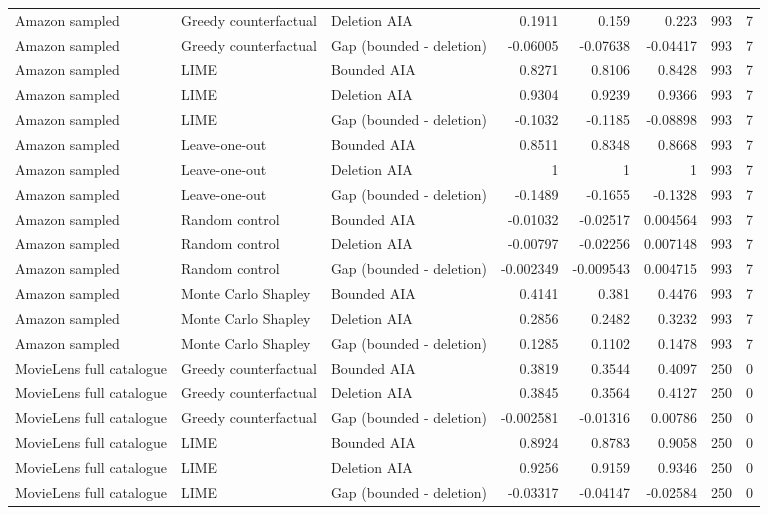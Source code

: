 \begin{table}[t]
{\begin{tabular}{lllrrrrr}
Amazon sampled & Greedy counterfactual & Deletion AIA & 0.1911 & 0.159 & 0.223 & 993 & 7 \\
Amazon sampled & Greedy counterfactual & Gap (bounded - deletion) & -0.06005 & -0.07638 & -0.04417 & 993 & 7 \\
Amazon sampled & LIME & Bounded AIA & 0.8271 & 0.8106 & 0.8428 & 993 & 7 \\
Amazon sampled & LIME & Deletion AIA & 0.9304 & 0.9239 & 0.9366 & 993 & 7 \\
Amazon sampled & LIME & Gap (bounded - deletion) & -0.1032 & -0.1185 & -0.08898 & 993 & 7 \\
Amazon sampled & Leave-one-out & Bounded AIA & 0.8511 & 0.8348 & 0.8668 & 993 & 7 \\
Amazon sampled & Leave-one-out & Deletion AIA & 1 & 1 & 1 & 993 & 7 \\
Amazon sampled & Leave-one-out & Gap (bounded - deletion) & -0.1489 & -0.1655 & -0.1328 & 993 & 7 \\
Amazon sampled & Random control & Bounded AIA & -0.01032 & -0.02517 & 0.004564 & 993 & 7 \\
Amazon sampled & Random control & Deletion AIA & -0.00797 & -0.02256 & 0.007148 & 993 & 7 \\
Amazon sampled & Random control & Gap (bounded - deletion) & -0.002349 & -0.009543 & 0.004715 & 993 & 7 \\
Amazon sampled & Monte Carlo Shapley & Bounded AIA & 0.4141 & 0.381 & 0.4476 & 993 & 7 \\
Amazon sampled & Monte Carlo Shapley & Deletion AIA & 0.2856 & 0.2482 & 0.3232 & 993 & 7 \\
Amazon sampled & Monte Carlo Shapley & Gap (bounded - deletion) & 0.1285 & 0.1102 & 0.1478 & 993 & 7 \\
MovieLens full catalogue & Greedy counterfactual & Bounded AIA & 0.3819 & 0.3544 & 0.4097 & 250 & 0 \\
MovieLens full catalogue & Greedy counterfactual & Deletion AIA & 0.3845 & 0.3564 & 0.4127 & 250 & 0 \\
MovieLens full catalogue & Greedy counterfactual & Gap (bounded - deletion) & -0.002581 & -0.01316 & 0.00786 & 250 & 0 \\
MovieLens full catalogue & LIME & Bounded AIA & 0.8924 & 0.8783 & 0.9058 & 250 & 0 \\
MovieLens full catalogue & LIME & Deletion AIA & 0.9256 & 0.9159 & 0.9346 & 250 & 0 \\
MovieLens full catalogue & LIME & Gap (bounded - deletion) & -0.03317 & -0.04147 & -0.02584 & 250 & 0 \\

\end{tabular}}
\end{table}
